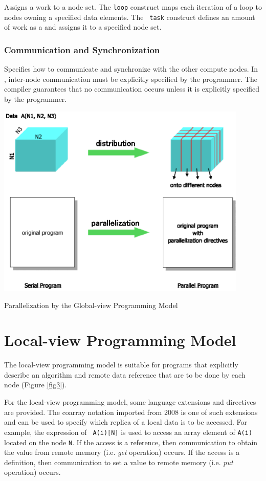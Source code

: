 Assigns a work to a node set. The {\tt loop} construct maps each
iteration of a loop to nodes owning a specified data elements. The {\tt
task} construct defines an amount of work as a {\it {}} and
assigns it to a specified node set.

\subsubsection*{Communication and Synchronization}

Specifies how to communicate and synchronize with the other compute
nodes. In {\XMP}, inter-node communication must be explicitly specified
by the programmer. The compiler guarantees that no communication occurs
unless it is explicitly specified by the programmer.

\begin{myfigure}
\includegraphics[width=12cm]{figs/Fig2.eps}
  \caption{Parallelization by the Global-view Programming Model}
\label{fig2}
\end{myfigure}

\section{Local-view Programming Model}

The local-view programming model is suitable for programs that
explicitly describe an algorithm and remote data reference that are to
be done by each node (Figure \ref{fig3}).

For the local-view programming model, some language extensions and 
directives are provided. The coarray notation imported from {\Fort} 2008
is one of such extensions and can be used to specify which replica of a
local data is to be accessed. For example, the expression of {\tt
A(i)[N]} is used to access an array element of {\tt A(i)} located on the
node {\tt N}.
%
If the access is a reference, then communication to obtain the value
from remote memory (i.e. {\it get} operation) occurs. If the access is a
definition, then communication to set a value to remote memory
(i.e. {\it put} operation) occurs.

